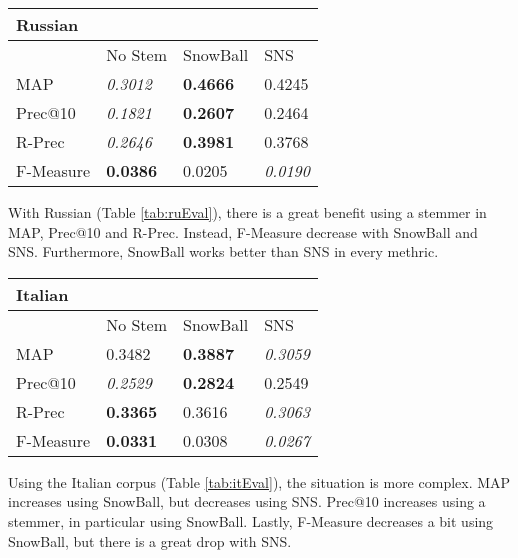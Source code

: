\begin{center}
   \begin{tabular}{| l | l | l | l |}
    \hline
    \multicolumn{4}{|l|}{\textbf{Russian}}\\ \hline
    & No Stem & SnowBall & SNS\\ \hline
    MAP & \textit{0.3012} & \textbf{0.4666} & 0.4245 \\ \hline
    Prec@10 & \textit{0.1821} & \textbf{0.2607}  & 0.2464 \\ \hline
    R-Prec & \textit{0.2646} & \textbf{0.3981} & 0.3768\\ \hline
    F-Measure & \textbf{0.0386} & 0.0205 & \textit{0.0190}\\ \hline    
    \end{tabular}
    \label{tab:ruEval}
\end{center}

With Russian (Table \ref{tab:ruEval}), there is a great benefit using a stemmer in MAP, Prec@10 and R-Prec. Instead, F-Measure decrease with SnowBall and SNS. Furthermore, SnowBall works better than SNS in every methric. 

\begin{center}
   \begin{tabular}{| l | l | l | l |}
    \hline
    \multicolumn{4}{|l|}{\textbf{Italian}}\\ \hline
    & No Stem & SnowBall & SNS\\ \hline
    MAP & 0.3482 & \textbf{0.3887} & \textit{0.3059} \\ \hline
    Prec@10 & \textit{0.2529} & \textbf{0.2824} & 0.2549 \\ \hline
    R-Prec & \textbf{0.3365} & 0.3616 & \textit{0.3063}\\ \hline
    F-Measure & \textbf{0.0331} & 0.0308 & \textit{0.0267} \\ \hline    
    \end{tabular}
    \label{tab:itEval}
\end{center}

Using the Italian corpus (Table \ref{tab:itEval}), the situation is more complex. MAP increases using SnowBall, but decreases using SNS. Prec@10 increases using a stemmer, in particular using SnowBall. Lastly, F-Measure decreases a bit using SnowBall, but there is a great drop with SNS.

